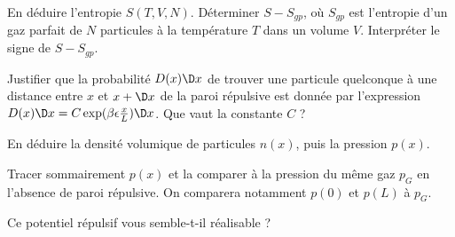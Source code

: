 \question En déduire l’entropie $S(T,V,N)$. Déterminer $S- S_{gp}$, où $S_{gp}$ est l’entropie d’un gaz parfait de $N$ particules à la température $T$ dans un volume $V$. Interpréter le signe de $S- S_{gp}$.


\question Justifier que la probabilité $D(x) \D x$ de trouver une particule quelconque à une distance entre $x$ et $x+\D x$ de la paroi répulsive est donnée par l'expression $D(x) \D x = C\exp( \beta \epsilon \frac{x}{L}) \D x$. Que vaut la constante $C$ ?

\question En déduire la densité volumique de particules $n(x)$, puis la pression $p(x)$.

\question Tracer sommairement $p(x)$ et la comparer à la pression du même gaz $p_G$ en l'absence de paroi répulsive. On comparera notamment $p(0)$ et $p(L)$ à $p_G$.

\question Ce potentiel répulsif vous semble-t-il réalisable ? 

